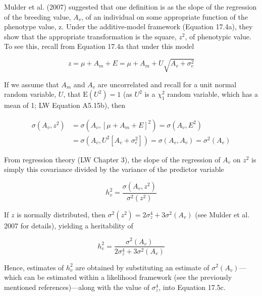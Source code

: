 \documentclass{article}
\begin{document}
Mulder et al. (2007) suggested that one definition is as the slope of the regression of the breeding value,  $ A_{v} $, of an individual on some appropriate function of the phenotype value, z. Under the additive-model framework (Equation 17.4a), they show that the appropriate transformation is the square,  $ z^{2} $, of phenotypic value. To see this, recall from Equation 17.4a that under this model

\begin{equation}
z=\mu+A_{m}+E=\mu+A_{m}+U\sqrt{A_{v}+\sigma_{e}^{2}}
\end{equation}

If we assume that  $ A_m $ and  $ A_v $ are uncorrelated and recall for a unit normal random variable,  $ U $, that  $ \mathrm{E}(U^2) = 1 $ (as  $ U^2 $ is a  $ \chi_1^2 $ random variable, which has a mean of 1; LW Equation A5.15b), then

\begin{equation}
\begin{aligned}\sigma(A_{v},z^{2})&=\sigma(A_{v},[\mu+A_{m}+E]^{2})=\sigma(A_{v},E^{2})\\&=\sigma(A_{v},U^{2}[A_{v}+\sigma_{e}^{2}])=\sigma(A_{v},A_{v})=\sigma^{2}(A_{v})\end{aligned}
\tag{17.5a}
\label{eq:17_5a}
\end{equation}

From regression theory (LW Chapter 3), the slope of the regression of  $ A_{v} $ on  $ z^{2} $ is simply this covariance divided by the variance of the predictor variable

\begin{equation}
h_{v}^{2}=\frac{\sigma(A_{v},z^{2})}{\sigma^{2}(z^{2})}
\tag{17.5b}
\label{eq:17_5b}
\end{equation}

If $z$ is normally distributed, then $\sigma^{2}(z^{2}) = 2\sigma_{z}^{4} + 3\sigma^{2}(A_{v})$ (see Mulder et al. 2007 for details), yielding a heritability of

\begin{equation}
h_{v}^{2}=\frac{\sigma^{2}(A_{v})}{2\sigma_{z}^{4}+3\sigma^{2}(A_{v})}
\tag{17.5c}
\label{eq:17_5c}
\end{equation}

Hence, estimates of  $ h_v^2 $ are obtained by substituting an estimate of  $ \sigma^2(A_v) $—which can be estimated within a likelihood framework (see the previously mentioned references)—along with the value of  $ \sigma_z^4 $, into Equation 17.5c.
\end{document}
